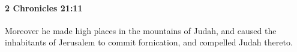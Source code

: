 
		\paragraph{2 Chronicles 21:11} %
			\label{2CHRONICLES-21-11}

			Moreover he made high places in the mountains of Judah, and caused the inhabitants of Jerusalem to commit fornication, and compelled Judah thereto.


